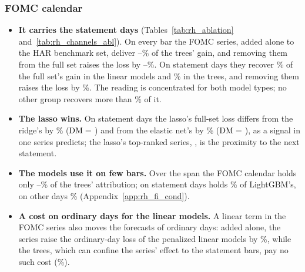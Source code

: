 \subsubsection{FOMC calendar}
\label{sec:rh_fi_event}
\begin{itemize}
\item \textbf{It carries the statement days} (Tables~\ref{tab:rh_ablation} and~\ref{tab:rh_channels_abl}). On every
  bar the FOMC series, added alone to the HAR benchmark set, deliver
  \rhabTreeFomcGainShareMin--\rhabTreeFomcGainShareMax\% of the trees' gain, and removing them from the full set
  raises the loss by \rhabLoFomcAllPctMin--\rhabLoFomcAllPctMax\%. On statement days they recover
  \rhchEvFomcShareLinRng\% of the full set's gain in the linear models and \rhchEvFomcShareTreeRng\% in the trees, and
  removing them raises the loss by \rhchEvLoFomcRng\%. The reading is concentrated for both model types; no other
  group recovers more than \rhchEvOtherMaxShare\% of it.
\item \textbf{The lasso wins.} On statement days the lasso's full-set loss differs from the ridge's by
  \rhchLassoRidgeEventPct\% ($\mathrm{DM}={}$\rhchLassoRidgeEventDm) and from the elastic net's by \rhchLassoEnetEventPct\%
  ($\mathrm{DM}={}$\rhchLassoEnetEventDm), as a signal in one series predicts; the lasso's top-ranked series, \rhldLassoTopOne,
  is the proximity to the next statement.
\item \textbf{The models use it on few bars.} Over the span the FOMC calendar holds only
  \rhfipFomcBucketMin--\rhfipFomcBucketMax\% of the trees' attribution; on statement days \rhfipFomcUntil{} holds
  \rhfipLgbmUntilFomc\% of LightGBM's, on other days \rhfipLgbmUntilOther\% (Appendix~\ref{app:rh_fi_cond}).
\item \textbf{A cost on ordinary days for the linear models.} A linear term in the FOMC series also moves the forecasts
  of ordinary days: added alone, the series raise the ordinary-day loss of the penalized linear models by
  \rhchOrdAddFomcLinRng\%, while the trees, which can confine the series' effect to the statement bars, pay no such
  cost (\rhchOrdAddFomcTreeRng\%).
\end{itemize}





